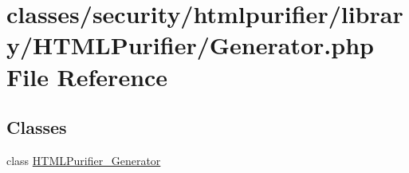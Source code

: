 \hypertarget{Generator_8php}{\section{classes/security/htmlpurifier/library/\+H\+T\+M\+L\+Purifier/\+Generator.php File Reference}
\label{Generator_8php}
}
\subsection*{Classes}
\begin{DoxyCompactItemize}
\item 
class \hyperlink{classHTMLPurifier__Generator}{H\+T\+M\+L\+Purifier\+\_\+\+Generator}
\end{DoxyCompactItemize}
